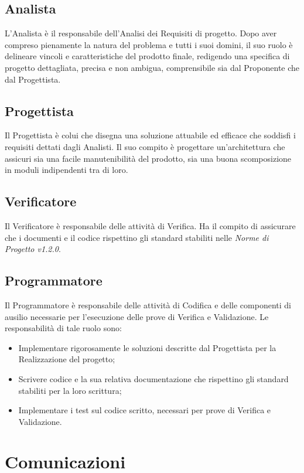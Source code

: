 \subsection{Analista}
\label{2.3}
L'Analista è il responsabile dell'Analisi dei Requisiti di progetto. Dopo aver compreso pienamente la natura del problema e tutti i suoi domini, il suo ruolo è delineare vincoli e caratteristiche del prodotto finale, redigendo una specifica di progetto dettagliata, precisa e non ambigua, comprensibile sia dal Proponente che dal Progettista.

\subsection{Progettista}
\label{2.4}
Il Progettista è colui che disegna una soluzione attuabile ed efficace che soddisfi i requisiti dettati dagli Analisti. Il suo compito è progettare un'architettura che assicuri sia una facile manutenibilità del prodotto, sia una buona scomposizione in moduli indipendenti tra di loro.

\subsection{Verificatore}
\label{2.5}
Il Verificatore è responsabile delle attività di Verifica. Ha il compito di assicurare che i documenti e il codice rispettino gli standard stabiliti nelle \emph{Norme di Progetto v1.2.0}.

\subsection{Programmatore}
\label{2.6}
Il Programmatore è responsabile delle attività di Codifica e delle componenti di ausilio
necessarie per l'esecuzione delle prove di Verifica e Validazione. Le responsabilità di tale ruolo sono:
\begin{itemize}
\item Implementare rigorosamente le soluzioni descritte dal Progettista per la Realizzazione del progetto;
\item Scrivere codice e la sua relativa documentazione che rispettino gli standard stabiliti per la loro scrittura;
\item Implementare i test sul codice scritto, necessari per prove di Verifica e Validazione.
\end{itemize}

\newpage
\section{Comunicazioni}
\label{3.0}

